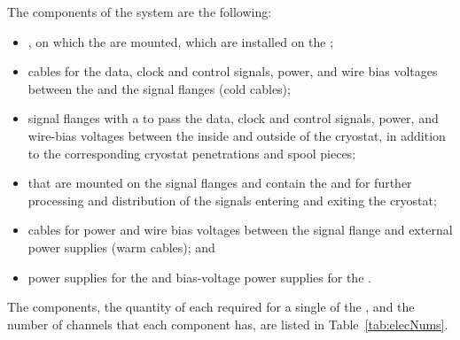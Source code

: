 The components of the  system are the following:
\begin{itemize}
\item{, on which the  are mounted, which are installed on the ;}
\item{cables for the data, clock and control signals,  power, and wire bias voltages between the  and the signal flanges (cold cables);}
\item{signal flanges with a  \fdth to pass the data, clock and control signals,  power, and  wire-bias voltages between the inside and outside of the cryostat, in addition to the corresponding cryostat penetrations and spool pieces;}
\item{%
 that are mounted on the signal flanges and contain
the %
 and %
 for further processing
and distribution of the signals entering and exiting the cryostat;}
\item{cables for  power and wire bias voltages between the signal flange and external power
supplies (warm cables); and}
\item{ power supplies for the  and bias-voltage power supplies for the .}
\end{itemize}

The components, the quantity of each required for a single  of the %
, and the number of channels that each component has, are listed in Table~\ref{tab:elecNums}.

